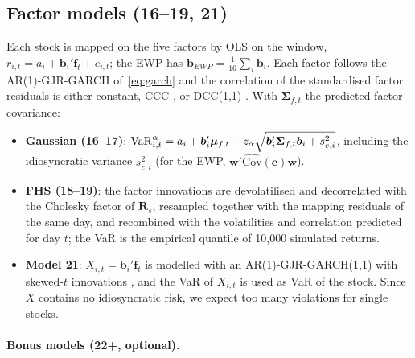 \subsection{Factor models (16--19, 21)}
Each stock is mapped on the five factors by OLS on the window, $r_{i,t} = a_i + \bm b_i'\bm f_t + e_{i,t}$; the EWP
has $\bm b_{EWP} = \frac1{16}\sum_i \bm b_i$. Each factor follows the AR(1)-GJR-GARCH of~\eqref{eq:garch} and the
correlation of the standardised factor residuals is either constant, CCC \citep{bollerslev1990}, or DCC(1,1)
\citep{engle2002}. With $\bm\Sigma_{f,t}$ the predicted factor covariance:
\begin{itemize}
  \item \textbf{Gaussian (16--17)}: $\mathrm{VaR}_{i,t}^\alpha = a_i + \bm b_i'\bm\mu_{f,t} + z_\alpha\sqrt{\bm b_i'\bm\Sigma_{f,t}\bm b_i + s^2_{e,i}}$,
        including the idiosyncratic variance $s^2_{e,i}$ (for the EWP, $\bm w'\widehat{\mathrm{Cov}}(\bm e)\bm w$).
  \item \textbf{FHS (18--19)}: the factor innovations are devolatilised and decorrelated with the Cholesky factor of
        $\bm R_s$, resampled together with the mapping residuals of the same day, and recombined with the
        volatilities and correlation predicted for day $t$; the VaR is the empirical quantile of 10{,}000 simulated returns.
  \item \textbf{Model 21}: $X_{i,t} = \bm b_i'\bm f_t$ is modelled with an AR(1)-GJR-GARCH(1,1) with skewed-$t$
        innovations \citep{hansen1994}, and the VaR of $X_{i,t}$ is used as VaR of the stock. Since $X$ contains no
        idiosyncratic risk, we expect too many violations for single stocks.
\end{itemize}

\paragraph{Bonus models (22+, optional).} 

